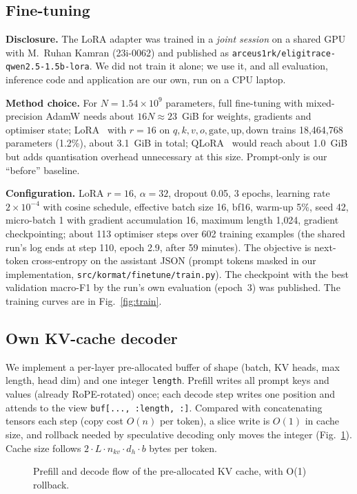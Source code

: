 \subsection{Fine-tuning}
\label{sec:finetune}
\textbf{Disclosure.} The LoRA adapter was trained in a \emph{joint session} on a shared GPU with M.\ Ruhan Kamran (23i-0062) and published as \texttt{arceus1rk/eligitrace-qwen2.5-1.5b-lora}. We did not train it alone; we use it, and all evaluation, inference code and application are our own, run on a CPU laptop.

\textbf{Method choice.} For $N=1.54\times10^9$ parameters, full fine-tuning with mixed-precision AdamW needs about $16N\approx 23$~GiB for weights, gradients and optimiser state; LoRA~\cite{hu2022lora} with $r{=}16$ on $q,k,v,o,\mathrm{gate},\mathrm{up},\mathrm{down}$ trains 18{,}464{,}768 parameters (1.2\%), about 3.1~GiB in total; QLoRA~\cite{dettmers2023qlora} would reach about 1.0~GiB but adds quantisation overhead unnecessary at this size. Prompt-only is our ``before'' baseline.

\textbf{Configuration.} LoRA $r=16$, $\alpha=32$, dropout 0.05, 3 epochs, learning rate $2\times10^{-4}$ with cosine schedule, effective batch size 16, bf16, warm-up 5\%, seed 42, micro-batch 1 with gradient accumulation 16, maximum length 1{,}024, gradient checkpointing; about 113 optimiser steps over 602 training examples (the shared run's log ends at step 110, epoch 2.9, after 59 minutes). The objective is next-token cross-entropy on the assistant JSON (prompt tokens masked in our implementation, \texttt{src/kormat/finetune/train.py}). The checkpoint with the best validation macro-F1 by the run's own evaluation (epoch~3) was published. The training curves are in Fig.~\ref{fig:train}.

\subsection{Own KV-cache decoder}
\label{sec:kv}
We implement a per-layer pre-allocated buffer of shape (batch, KV heads, max length, head dim) and one integer \texttt{length}. Prefill writes all prompt keys and values (already RoPE-rotated) once; each decode step writes one position and attends to the view \texttt{buf[..., :length, :]}. Compared with concatenating tensors each step (copy cost $O(n)$ per token), a slice write is $O(1)$ in cache size, and rollback needed by speculative decoding only moves the integer (Fig.~\ref{fig:kv}). Cache size follows $2\cdot L\cdot n_{kv}\cdot d_h\cdot b$ bytes per token.
\begin{figure}[t]\centering
\resizebox{\columnwidth}{!}{}
\caption{Prefill and decode flow of the pre-allocated KV cache, with O(1) rollback.}
\label{fig:kv}
\end{figure}

